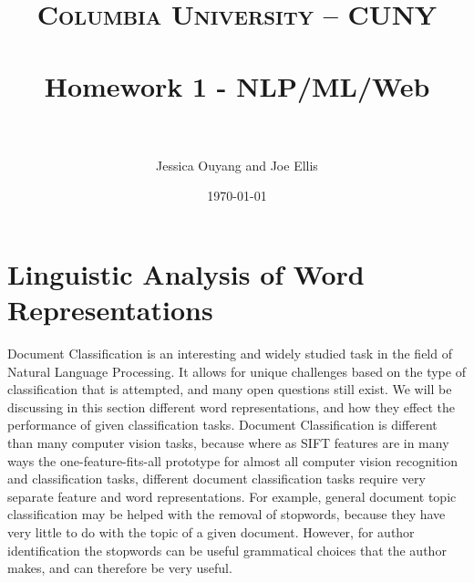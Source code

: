 \documentclass[paper=a4, fontsize=11pt]{scrartcl} %
\title{	
\normalfont \normalsize 
\textsc{Columbia University -- CUNY} \\ [25pt] %
\horrule{0.5pt} \\[0.4cm] %
\huge Homework 1 - NLP/ML/Web \\ %
\horrule{2pt} \\[0.5cm] %
}
\author{Jessica Ouyang and Joe Ellis} %
\date{\normalsize\today} %
\numberwithin{equation}{section} %
\numberwithin{figure}{section} %
\numberwithin{table}{section} %
\begin{document}
\maketitle %


\section{Linguistic Analysis of Word Representations}

Document Classification is an interesting and widely studied task in the field of Natural Language Processing.  
It allows for unique challenges based on the type of classification that is attempted, and many open questions still exist.   
We will be discussing in this section different word representations, and how they effect the performance of given classification tasks.  
Document Classification is different than many computer vision tasks, because where as SIFT features are in many ways the one-feature-fits-all prototype for almost all computer vision recognition and classification tasks, different document classification tasks require very separate feature and word representations.  
For example, general document topic classification may be helped with the removal of stopwords, because they have very little to do with the topic of a given document.  
However, for author identification the stopwords can be useful grammatical choices that the author makes, and can therefore be very useful.  
\end{document}
